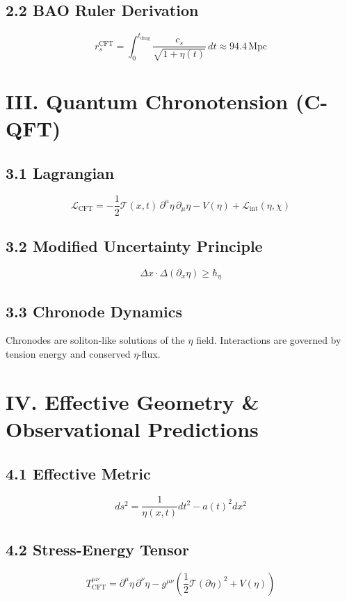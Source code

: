 \documentclass[12pt]{article}
\begin{document}
\subsection*{2.2 BAO Ruler Derivation}
\[
r_s^{\text{CFT}} = \int_0^{t_{\text{drag}}} \frac{c_s}{\sqrt{1 + \eta(t)}} \, dt \approx 94.4 \, \text{Mpc}
\]

\section*{III. Quantum Chronotension (C-QFT)}

\subsection*{3.1 Lagrangian}
\[
\mathcal{L}_{\text{CFT}} = -\frac{1}{2} \mathcal{T}(x,t) \, \partial^\mu \eta \, \partial_\mu \eta - V(\eta) + \mathcal{L}_{\text{int}}(\eta, \chi)
\]

\subsection*{3.2 Modified Uncertainty Principle}
\[
\Delta x \cdot \Delta(\partial_x \eta) \geq \hbar_\eta
\]

\subsection*{3.3 Chronode Dynamics}
Chronodes are soliton-like solutions of the \( \eta \) field. Interactions are governed by tension energy and conserved \( \eta \)-flux.

\section*{IV. Effective Geometry \& Observational Predictions}

\subsection*{4.1 Effective Metric}
\[
ds^2 = \frac{1}{\eta(x,t)} dt^2 - a(t)^2 dx^2
\]

\subsection*{4.2 Stress-Energy Tensor}
\[
T^{\mu\nu}_{\text{CFT}} = \partial^\mu \eta \, \partial^\nu \eta - g^{\mu\nu} \left( \frac{1}{2} \mathcal{T} (\partial \eta)^2 + V(\eta) \right)
\]
\end{document}
